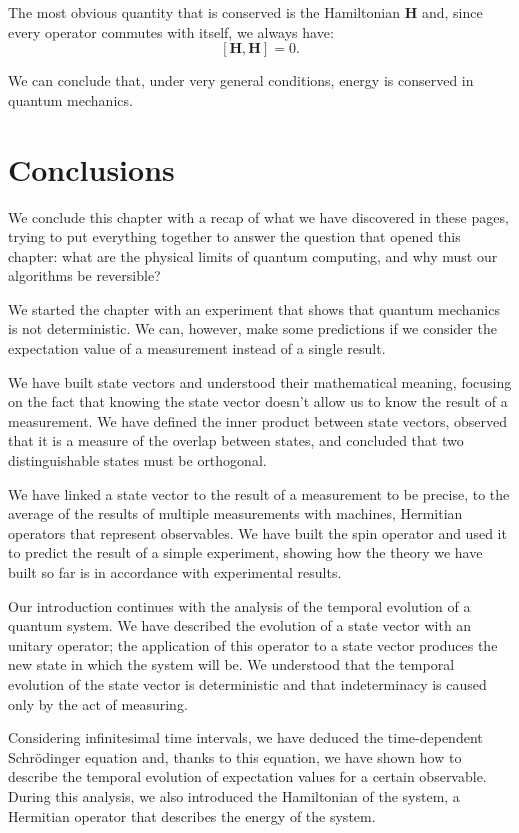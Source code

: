 The most obvious quantity that is conserved is the Hamiltonian $\mathbf{H}$ and, since every operator commutes with itself, we always have:
\[
[\mathbf{H},\mathbf{H}] = 0.
\]

We can conclude that, under very general conditions, energy is conserved in quantum mechanics.

\section{Conclusions}
We conclude this chapter with a recap of what we have discovered in these pages, trying to put everything together to answer the question that opened this chapter: what are the physical limits of quantum computing, and why must our algorithms be reversible?

We started the chapter with an experiment that shows that quantum mechanics is not deterministic. We can, however, make some predictions if we consider the expectation value of a measurement instead of a single result.

We have built state vectors and understood their mathematical meaning, focusing on the fact that knowing the state vector doesn't allow us to know the result of a measurement. We have defined the inner product between state vectors, observed that it is a measure of the overlap between states, and concluded that two distinguishable states must be orthogonal.

We have linked a state vector to the result of a measurement \textendash{}to be precise, to the average of the results of multiple measurements\textendash{} with machines, Hermitian operators that represent observables. We have built the spin operator and used it to predict the result of a simple experiment, showing how the theory we have built so far is in accordance with experimental results.

Our introduction continues with the analysis of the temporal evolution of a quantum system. We have described the evolution of a state vector with an unitary operator; the application of this operator to a state vector produces the new state in which the system will be. We understood that the temporal evolution of the state vector is deterministic and that indeterminacy is caused only by the act of measuring.

Considering infinitesimal time intervals, we have deduced the time-dependent Schrödinger equation and, thanks to this equation, we have shown how to describe the temporal evolution of expectation values for a certain observable. During this analysis, we also introduced the Hamiltonian of the system, a Hermitian operator that describes the energy of the system. 

